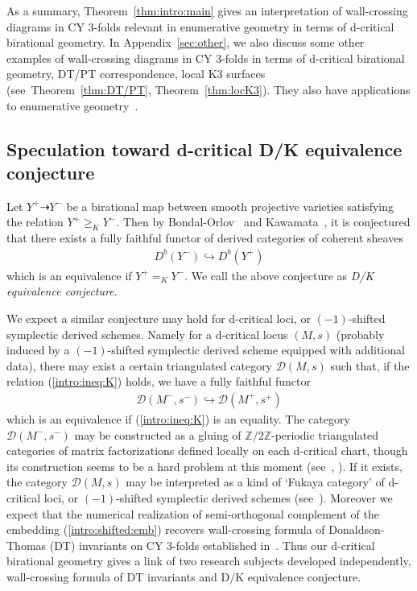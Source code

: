 \documentclass[11pt]{amsart}
\theoremstyle{plain}
\theoremstyle{definition}
\theoremstyle{remark}
\newcommand{\dD}{\mathcal{D}}
\begin{document}
As a summary, Theorem~\ref{thm:intro:main}
gives an interpretation of wall-crossing
diagrams in CY 3-folds
relevant in enumerative geometry 
in terms of d-critical birational geometry. 
In Appendix~\ref{sec:other}, we also 
discuss some other examples of 
wall-crossing diagrams in CY 3-folds in terms
of d-critical birational geometry, 
DT/PT correspondence, local K3 surfaces
(see~Theorem~\ref{thm:DT/PT}, Theorem~\ref{thm:locK3}). 
They also have applications to 
enumerative geometry~\cite{BrH, Tcurve1, TodK3}. 
\subsection{Speculation toward d-critical D/K equivalence conjecture}
Let $Y^{+} \dashrightarrow Y^{-}$ be a birational map 
between smooth projective varieties 
satisfying the relation $Y^{+} \ge_K Y^{-}$. 
Then by Bondal-Orlov~\cite{B-O2} and Kawamata~\cite{Ka1}, 
it is conjectured that there exists a fully faithful functor
of derived categories of coherent sheaves
\begin{align*}
D^b(Y^{-}) \hookrightarrow D^b(Y^{+})
\end{align*}
which is an equivalence if $Y^{+}=_K Y^{-}$. 
We call the above conjecture as \textit{D/K equivalence conjecture}. 

We expect a similar conjecture may hold 
for d-critical 
loci, or $(-1)$-shifted symplectic 
derived schemes. 
 Namely 
for a d-critical locus $(M, s)$ 
(probably induced by a $(-1)$-shifted symplectic
derived scheme
equipped 
with additional data), 
there may exist a certain 
triangulated category $\dD(M, s)$ such that, 
if the relation (\ref{intro:ineq:K}) holds, we have 
a fully faithful functor
\begin{align}\label{intro:shifted:emb}
\dD(M^{-}, s^{-}) \hookrightarrow 
\dD(M^{+}, s^{+})
\end{align}
which is an equivalence if (\ref{intro:ineq:K}) is an equality. 
The category $\dD(M^{-}, s^{-})$ may be 
constructed as a gluing of 
$\mathbb{Z}/2\mathbb{Z}$-periodic triangulated categories of 
matrix factorizations
defined locally on each d-critical chart, 
though its construction seems to be a hard 
problem at this moment 
(see~\cite[(J)]{Jslide}, \cite[Section~6.1]{MR3728637}). 
If it exists, the category $\dD(M, s)$
may be interpreted as a kind of `Fukaya category'
of d-critical loci, 
or $(-1)$-shifted symplectic derived schemes
(see~\cite[Conjecture~1.2]{JoySaf}). 
Moreover we expect that the 
numerical realization of 
semi-orthogonal 
complement of the embedding (\ref{intro:shifted:emb})
recovers wall-crossing formula 
of Donaldson-Thomas (DT)
invariants on CY 3-folds established in~\cite{JS, K-S}. 
Thus our d-critical birational geometry 
gives a link of two research subjects 
developed independently, wall-crossing formula of 
DT invariants and D/K equivalence conjecture. 
\end{document}
